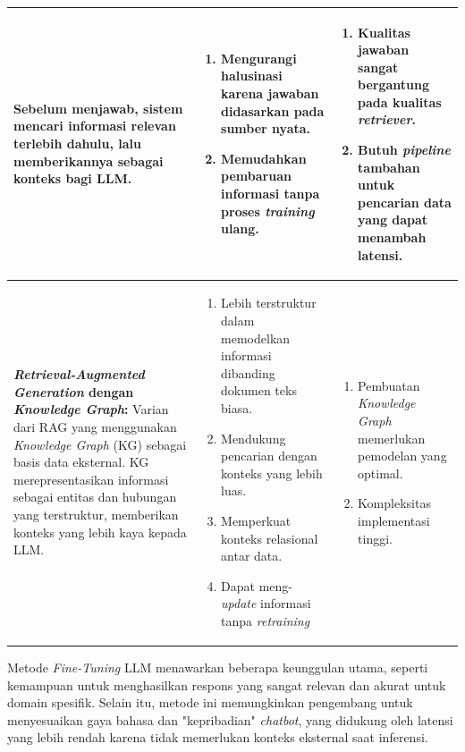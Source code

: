 \begin{longtable}{|p{4cm}|p{5cm}|p{5cm}|}
	Sebelum menjawab, sistem mencari informasi relevan terlebih dahulu, lalu memberikannya sebagai konteks bagi LLM.
	                &
	\begin{enumerate}
		\item Mengurangi halusinasi karena jawaban didasarkan pada sumber nyata.
		\item Memudahkan pembaruan informasi tanpa proses \textit{training} ulang.
	\end{enumerate}
	                &
	\begin{enumerate}
		\item Kualitas jawaban sangat bergantung pada kualitas \textit{retriever}.
		\item Butuh \textit{pipeline} tambahan untuk pencarian data yang dapat menambah latensi.
	\end{enumerate}
	\\
	\hline
	\textbf{\textit{Retrieval-Augmented Generation} dengan \textit{Knowledge Graph}: }
	Varian dari RAG yang menggunakan \textit{Knowledge Graph} (KG) sebagai basis data eksternal.
	KG merepresentasikan informasi sebagai entitas dan hubungan yang terstruktur, memberikan konteks yang lebih kaya kepada LLM.
	                &
	\begin{enumerate}
		\item Lebih terstruktur dalam memodelkan informasi dibanding dokumen teks biasa.
		\item Mendukung pencarian dengan konteks yang lebih luas.
		\item Memperkuat konteks relasional antar data.
		\item Dapat meng-\textit{update} informasi tanpa \textit{retraining}
	\end{enumerate}
	                &
	\begin{enumerate}
		\item Pembuatan \textit{Knowledge Graph} memerlukan pemodelan yang optimal.
		\item Kompleksitas implementasi tinggi.
	\end{enumerate}
	\\
	\hline
\end{longtable}

Metode \textit{Fine-Tuning} LLM menawarkan beberapa keunggulan utama, seperti kemampuan untuk menghasilkan respons yang sangat relevan dan akurat untuk domain spesifik.
Selain itu, metode ini memungkinkan pengembang untuk menyesuaikan gaya bahasa dan "kepribadian" \textit{chatbot}, yang didukung oleh latensi yang lebih rendah karena tidak memerlukan konteks eksternal saat inferensi.

